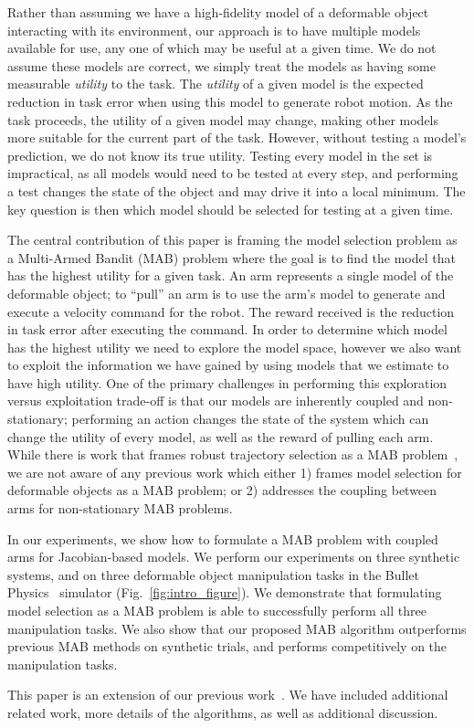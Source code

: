 Rather than assuming we have a high-fidelity model of a deformable object interacting with its environment, our approach is to have multiple models available for use, any one of which may be useful at a given time. We do not assume these models are correct, we simply treat the models as having some measurable \textit{utility} to the task. The \textit{utility} of a given model is the expected reduction in task error when using this model to generate robot motion. As the task proceeds, the utility of a given model may change, making other models more suitable for the current part of the task. However, without testing a model's prediction, we do not know its true utility. Testing every model in the set is impractical, as all models would need to be tested at every step, and performing a test changes the state of the object and may drive it into a local minimum. The key question is then which model should be selected for testing at a given time.

The central contribution of this paper is framing the model selection problem as a Multi-Armed Bandit (MAB) problem where the goal is to find the model that has the highest utility for a given task. An arm represents a single model of the deformable object; to ``pull'' an arm is to use the arm's model to generate and execute a velocity command for the robot. The reward received is the reduction in task error after executing the command. In order to determine which model has the highest utility we need to explore the model space, however we also want to exploit the information we have gained by using models that we estimate to have high utility. One of the primary challenges in performing this exploration versus exploitation trade-off is that our models are inherently coupled and non-stationary; performing an action changes the state of the system which can change the utility of every model, as well as the reward of pulling each arm. While there is work that frames robust trajectory selection as a MAB problem~\cite{Koval2015}, we are not aware of any previous work which either 1) frames model selection for deformable objects as a MAB problem; or 2) addresses the coupling between arms for non-stationary MAB problems.

In our experiments, we show how to formulate a MAB problem with coupled arms for Jacobian-based models. We perform our experiments on three synthetic systems, and on three deformable object manipulation tasks in the Bullet Physics~\cite{Coumans2010} simulator (Fig.~\ref{fig:intro_figure}). We demonstrate that formulating model selection as a MAB problem is able to successfully perform all three manipulation tasks. We also show that our proposed MAB algorithm outperforms previous MAB methods on synthetic trials, and performs competitively on the manipulation tasks.

This paper is an extension of our previous work~\cite{dale_wafr}. We have included additional related work, more details of the algorithms, as well as additional discussion.